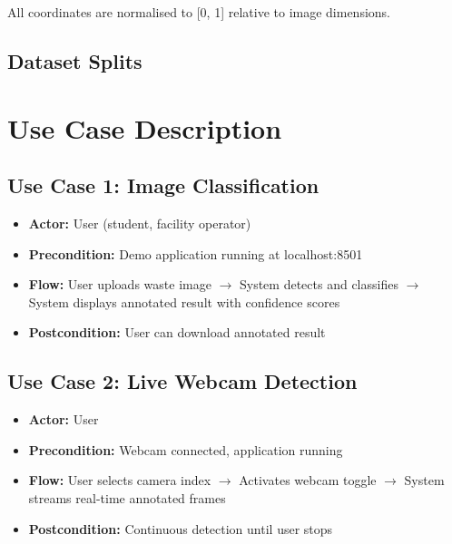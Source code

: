 All coordinates are normalised to [0, 1] relative to image dimensions.

\subsection{Dataset Splits}

\begin{table}[H]
\centering
\caption{Dataset Split Distribution}
\label{tab:splits}
\end{table}

\section{Use Case Description}

\subsection{Use Case 1: Image Classification}
\begin{itemize}
    \item \textbf{Actor:} User (student, facility operator)
    \item \textbf{Precondition:} Demo application running at localhost:8501
    \item \textbf{Flow:} User uploads waste image $\rightarrow$ System detects and classifies $\rightarrow$ System displays annotated result with confidence scores
    \item \textbf{Postcondition:} User can download annotated result
\end{itemize}

\subsection{Use Case 2: Live Webcam Detection}
\begin{itemize}
    \item \textbf{Actor:} User
    \item \textbf{Precondition:} Webcam connected, application running
    \item \textbf{Flow:} User selects camera index $\rightarrow$ Activates webcam toggle $\rightarrow$ System streams real-time annotated frames
    \item \textbf{Postcondition:} Continuous detection until user stops
\end{itemize}

